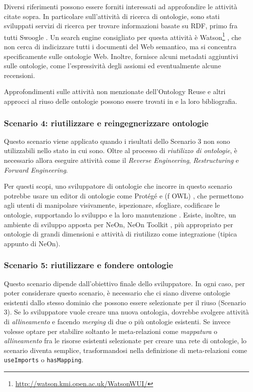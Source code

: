 \noindent Diversi riferimenti possono essere forniti interessati ad approfondire le attività citate sopra. In particolare sull'attività di ricerca di ontologie, sono stati sviluppati servizi di ricerca per trovare informazioni basate su RDF, primo fra tutti Swoogle \cite{swoogle}. Un search engine consigliato per questa attività è Watson\footnote{\url{http://watson.kmi.open.ac.uk/WatsonWUI/}} \cite{watson}, che non cerca di indicizzare tutti i documenti del Web semantico, ma si concentra specificamente sulle ontologie Web. Inoltre, fornisce alcuni metadati aggiuntivi sulle ontologie, come l'espressività degli assiomi ed eventualmente alcune recensioni.

Approfondimenti sulle attività non menzionate dell'Ontology Reuse e altri approcci al riuso delle ontologie possono essere trovati in \cite{carriero2020OntoReuse, caldarolaMultiStrategyApproach, ontologyEvaluation} e la loro bibliografia.
\subsubsection*{Scenario 4: riutilizzare e reingegnerizzare ontologie}
Questo scenario viene applicato quando i risultati dello Scenario 3 non sono utilizzabili nello stato in cui sono. Oltre al processo di \textit{riutilizzo di ontologie}, è necessario allora eseguire attività come il \textit{Reverse Engineering}, \textit{Restructuring} e \textit{Forward Engineering}. 

Per questi scopi, uno sviluppatore di ontologie che incorre in questo scenario potrebbe usare un editor di ontologie come Prot\'eg\'e \cite{protege} e (f OWL) \cite{fOWL}, che permettono agli utenti di manipolare visivamente, ispezionare, sfogliare, codificare le ontologie, supportando lo sviluppo e la loro manutenzione \cite{alatrish2012comparison}. Esiste, inoltre, un ambiente di sviluppo apposta per NeOn, NeOn Toolkit \cite{NeOnToolkit}, più appropriato per ontologie di grandi dimensioni e attività di riutilizzo come integrazione (tipica appunto di NeOn).

\subsubsection*{Scenario 5: riutilizzare e fondere ontologie}
Questo scenario dipende dall'obiettivo finale dello sviluppatore. In ogni caso, per poter considerare questo scenario, è necessario che ci siano diverse ontologie esistenti dallo stesso dominio che possono essere selezionate per il riuso (Scenario 3). Se lo sviluppatore vuole creare una nuova ontologia, dovrebbe svolgere attività di \textit{allineamento} e facendo \textit{merging} di due o più ontologie esistenti. Se invece volesse optare per stabilire soltanto le meta-relazioni come \textit{mappatura} o \textit{allineamento} fra le risorse esistenti selezionate per creare una rete di ontologie, lo scenario diventa semplice, trasformandosi nella definizione di meta-relazioni come \texttt{useImports} o \texttt{hasMapping}.

